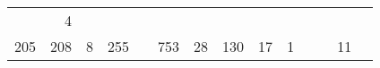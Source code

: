 \documentclass[]{article}
\begin{document}
{\begin{longtable}[]{@{}rrrrrrrrrrrrrr@{}}
\begin{minipage}[t]{0.04\columnwidth}
\strut
\end{minipage} & \begin{minipage}[t]{0.04\columnwidth}\raggedleft\strut
4\strut
\end{minipage} & \begin{minipage}[t]{0.04\columnwidth}\raggedleft\strut
\strut
\end{minipage}\tabularnewline
\begin{minipage}[t]{0.05\columnwidth}\raggedleft\strut
205\strut
\end{minipage} & \begin{minipage}[t]{0.05\columnwidth}\raggedleft\strut
208\strut
\end{minipage} & \begin{minipage}[t]{0.05\columnwidth}\raggedleft\strut
8\strut
\end{minipage} & \begin{minipage}[t]{0.05\columnwidth}\raggedleft\strut
255\strut
\end{minipage} & \begin{minipage}[t]{0.05\columnwidth}\raggedleft\strut
\strut
\end{minipage} & \begin{minipage}[t]{0.05\columnwidth}\raggedleft\strut
753\strut
\end{minipage} & \begin{minipage}[t]{0.05\columnwidth}\raggedleft\strut
28\strut
\end{minipage} & \begin{minipage}[t]{0.04\columnwidth}\raggedleft\strut
130\strut
\end{minipage} & \begin{minipage}[t]{0.05\columnwidth}\raggedleft\strut
17\strut
\end{minipage} & \begin{minipage}[t]{0.04\columnwidth}\raggedleft\strut
1\strut
\end{minipage} & \begin{minipage}[t]{0.04\columnwidth}\raggedleft\strut
\strut
\end{minipage} & \begin{minipage}[t]{0.04\columnwidth}\raggedleft\strut
\strut
\end{minipage} & \begin{minipage}[t]{0.04\columnwidth}\raggedleft\strut
11\strut
\end{minipage} & \begin{minipage}[t]{0.04\columnwidth}\raggedleft\strut
\strut
\end{minipage}\tabularnewline

\end{longtable}}
\end{document}
